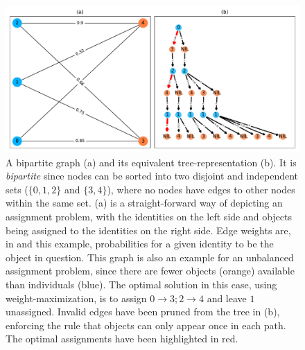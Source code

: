 \documentclass[9pt,lineno]{elife}
\newcommand{\TRex}{\protect\path{TRex}}
\begin{document}
\begin{figure}
\includegraphics[width=1.0\textwidth]{figures/tree.pdf}
\caption{A bipartite graph (a) and its equivalent tree-representation (b). It is \textit{bipartite} since nodes can be sorted into two disjoint and independent sets ($\{0,1,2\}$ and $\{3,4\}$), where no nodes have edges to other nodes within the same set. (a) is a straight-forward way of depicting an assignment problem, with the identities on the left side and objects being assigned to the identities on the right side. Edge weights are, in \TRex{} and this example, probabilities for a given identity to be the object in question. This graph is also an example for an unbalanced assignment problem, since there are fewer objects (orange) available than individuals (blue). The optimal solution in this case, using weight-maximization, is to assign $0\rightarrow3; 2\rightarrow4$ and leave $1$ unassigned. Invalid edges have been pruned from the tree in (b), enforcing the rule that objects can only appear once in each path. The optimal assignments have been highlighted in red.}
\label{fig:bipartite_graph}
\end{figure}
\end{document}
